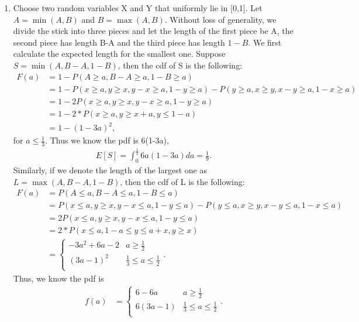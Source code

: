 \documentclass[10pt]{article}
\begin{document}
\begin{enumerate}
\item %
Choose two random variables X and Y that uniformly lie in [0,1]. Let $A=\min(A,B)$ and $B=\max(A,B)$. Without loss of generality, we divide the stick into three pieces and let the length of the first piece be A, the second piece has length B-A and the third piece has length $1-B$. We first calculate the expected length for the smallest one. Suppose $S=\min(A,B-A,1-B)$, then the cdf of S is the following:
\begin{align}
F(a) &= 1 - P(A\geq a, B-A\geq a, 1-B\geq a) \nonumber \\
&=1-P(x\geq a, y\geq x, y-x \geq a, 1- y\geq a) - P(y\geq a, x\geq y, x-y\geq a, 1-x\geq a) \nonumber \\
&=1-2 P(x\geq a, y\geq x, y-x \geq a, 1- y\geq a) \nonumber \\
&=1-2 * P(x\geq a, y\geq x+a, y\leq 1-a) \nonumber \\
&=1-(1-3a)^{2}, \nonumber 
\end{align}
for $a\leq \frac{1}{3}$. Thus we know the pdf is 6(1-3a), 
\begin{align}
E[S]=\int_{0}^{\frac{1}{3}}6a(1-3a)da=\frac{1}{9}. \nonumber 
\end{align}
Similarly, if we denote the length of the largest one as $L=\max(A,B-A,1-B)$, then the cdf of L is the following:
\begin{align}
F(a) &= P(A\leq a, B-A\leq a, 1-B\leq a) \nonumber \\
&=P(x\leq a, y\geq x, y-x \leq  a, 1- y\leq a) - P(y\leq a, x\geq y, x-y\leq a, 1-x\leq a) \nonumber \\
&=2 P(x\leq a, y\geq x, y-x \leq a, 1- y\leq a) \nonumber \\
&=2 * P(x\leq a, 1-a \leq y\leq a+x, y\geq x) \nonumber \\
&=\begin{cases}
    -3a^{2}+6a-2      & a\geq \frac{1}{2}\\
    (3a-1)^{2}  & \frac{1}{3}\leq a\leq \frac{1}{2}\\
  \end{cases}. \nonumber 
\end{align}
Thus, we know the pdf is
\begin{align}
f(a)&=\begin{cases}
    6-6a      & a\geq \frac{1}{2}\\
    6(3a-1)  & \frac{1}{3}\leq a\leq \frac{1}{2}\\
  \end{cases}. \nonumber 
\end{align}


\end{enumerate}
\end{document}
